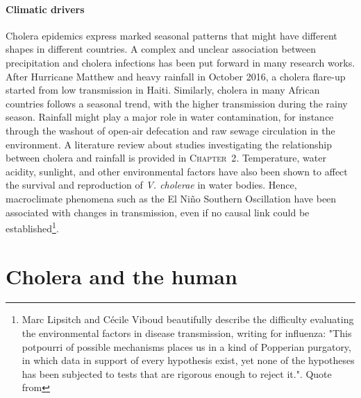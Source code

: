 \paragraph{Climatic drivers} Cholera epidemics express marked seasonal patterns that might have different shapes in different countries. A complex and unclear association between precipitation and cholera infections has been put forward in many research works. 
After Hurricane Matthew and heavy rainfall in October 2016, a cholera flare-up started from low transmission in Haiti\cite{Pasetto:RealtimeForecastingCholera:2018}. Similarly, cholera in many African countries follows a seasonal trend, with the higher transmission during the rainy season\cite{Baracchini:SeasonalityCholeraDynamics:2017}.  Rainfall might play a major role in water contamination, for instance through the washout of open-air defecation and raw sewage circulation in the environment. A literature review about studies investigating the relationship between cholera and rainfall is provided in \textsc{Chapter~2}. Temperature, water acidity, sunlight, and other environmental factors have also been shown to affect the survival and reproduction of \textit{V. cholerae} in water bodies. Hence, macroclimate phenomena such as the El Niño Southern Oscillation have been associated with changes in transmission, even if no causal link could be established\cite[-2\baselineskip]{Pascual:CholeraDynamicsNinoSouthern:2000}\footnote{Marc Lipsitch and Cécile Viboud beautifully describe the difficulty evaluating the environmental factors in disease transmission, writing for influenza: "This potpourri of possible mechanisms places us in a kind of Popperian purgatory, in which data in support of every hypothesis exist, yet none of the hypotheses has been subjected to tests that are rigorous enough to reject it.". Quote from  }.

\section{Cholera and the human} 
